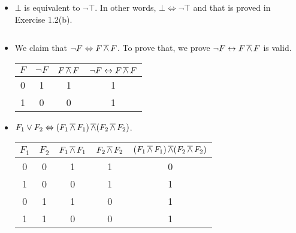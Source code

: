 \begin{exer}[1.3]
    $ $
    \begin{itemize}
        \item
            $\bot$ is equivalent to $\neg \top$.
            In other words, $\bot \Leftrightarrow \neg \top$ and that is proved in Exercise 1.2(b).
    \end{itemize}
\end{exer}

\begin{exer}[1.4]
    $ $
    \begin{itemize}
        \item
            We claim that $\neg F \Leftrightarrow F \operatorname{\overline{\land}} F$.
            To prove that, we prove $\neg F \leftrightarrow F \operatorname{\overline{\land}} F$ is valid.
            \begin{center}
                \begin{tabular}{ |c|c|c||c| }
                    \hline
                    $F$ & $\neg F$ & $F \operatorname{\overline{\land}} F$ & $\neg F \leftrightarrow F \operatorname{\overline{\land}} F$\\
                    \hline
                    0 & 1 & 1 & 1 \\
                    \hline
                    1 & 0 & 0 & 1 \\
                    \hline
                \end{tabular}
            \end{center}
        \item
            $F_1 \lor F_2 \Leftrightarrow (F_1 \operatorname{\overline{\land}} F_1) \operatorname{\overline{\land}} (F_2 \operatorname{\overline{\land}} F_2)$.
            \begin{center}
                \begin{tabular}{ |c|c|c|c||c| }
                    \hline
                    $F_1$ & $F_2$ & $F_1 \operatorname{\overline{\land}} F_1$ & $F_2 \operatorname{\overline{\land}} F_2$ & $(F_1 \operatorname{\overline{\land}} F_1) \operatorname{\overline{\land}} (F_2 \operatorname{\overline{\land}} F_2)$\\
                    \hline
                    0 & 0 & 1 & 1 & 0 \\
                    \hline
                    1 & 0 & 0 & 1 & 1 \\
                    \hline
                    0 & 1 & 1 & 0 & 1 \\
                    \hline
                    1 & 1 & 0 & 0 & 1 \\
                    \hline
                \end{tabular}
            \end{center}
    \end{itemize}
\end{exer}


